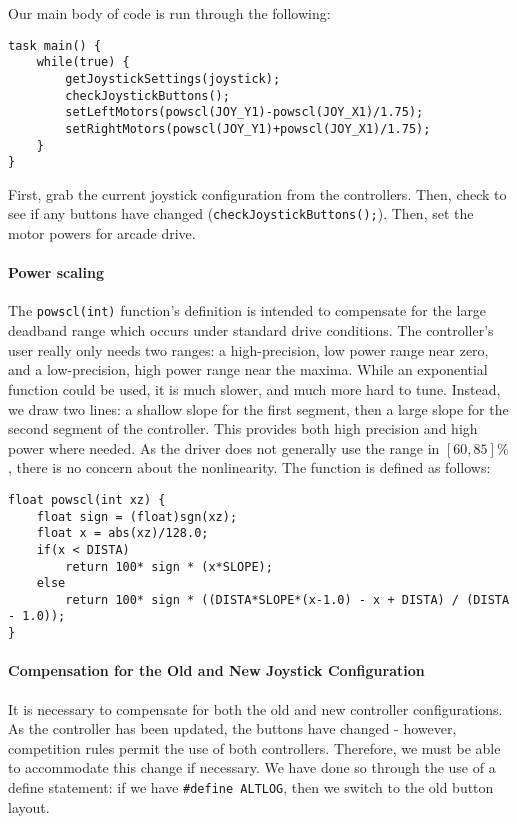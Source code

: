 Our main body of code is run through the following:

\begin{lstlisting}[tabsize=4]
task main() {
	while(true) {
		getJoystickSettings(joystick);
		checkJoystickButtons();
		setLeftMotors(powscl(JOY_Y1)-powscl(JOY_X1)/1.75);
		setRightMotors(powscl(JOY_Y1)+powscl(JOY_X1)/1.75);
	}
}
\end{lstlisting}

First, grab the current joystick configuration from the controllers. Then, check to see if any buttons have changed (\lstinline{checkJoystickButtons();}{}). Then, set the motor powers for arcade drive. 

\paragraph{Power scaling} The \lstinline{powscl(int)}{} function's definition is intended to compensate for the large deadband range which occurs under standard drive conditions. The controller's user really only needs two ranges: a high-precision, low power range near zero, and a low-precision, high power range near the maxima. While an exponential function could be used, it is much slower, and much more hard to tune. Instead, we draw two lines: a shallow slope for the first segment, then a large slope for the second segment of the controller. This provides both high precision and high power where needed. As the driver does not generally use the range in $[60,85]\%$, there is no concern about the nonlinearity. The function is defined as follows:

\begin{lstlisting}[tabsize=4]
float powscl(int xz) {
	float sign = (float)sgn(xz);
	float x = abs(xz)/128.0;
	if(x < DISTA)
		return 100* sign * (x*SLOPE);
	else
		return 100* sign * ((DISTA*SLOPE*(x-1.0) - x + DISTA) / (DISTA - 1.0));
}
\end{lstlisting}

\paragraph{Compensation for the Old and New Joystick Configuration} It is necessary to compensate for both the old and new controller configurations. As the controller has been updated, the buttons have changed - however, competition rules permit the use of both controllers. Therefore, we must be able to accommodate this change if necessary. We have done so through the use of a define statement: if we have \lstinline{#define ALTLOG}{}, then we switch to the old button layout.


